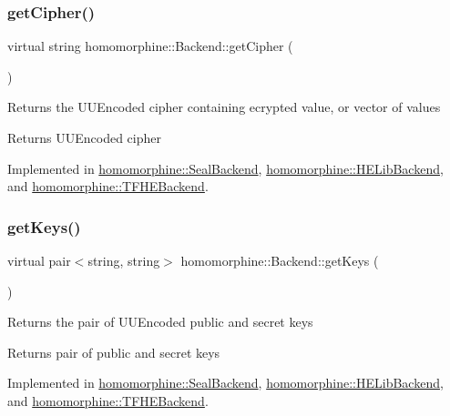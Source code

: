 \subsubsection{\texorpdfstring{getCipher()}{getCipher()}}
{\footnotesize\ttfamily virtual string homomorphine\+::\+Backend\+::get\+Cipher (\begin{DoxyParamCaption}{ }\end{DoxyParamCaption})\hspace{0.3cm}{\ttfamily [pure virtual]}}

Returns the U\+U\+Encoded cipher containing ecrypted value, or vector of values

\begin{DoxyReturn}{Returns}
U\+U\+Encoded cipher 
\end{DoxyReturn}


Implemented in \mbox{\hyperlink{classhomomorphine_1_1_seal_backend_a0917c586791e74b83f4ca0932e5e4d8e}{homomorphine\+::\+Seal\+Backend}}, \mbox{\hyperlink{classhomomorphine_1_1_h_e_lib_backend_a9ba4311289e3b8c47f389f4f44de7d5d}{homomorphine\+::\+H\+E\+Lib\+Backend}}, and \mbox{\hyperlink{classhomomorphine_1_1_t_f_h_e_backend_a91365d9637786bf06bfa16390b05e7a5}{homomorphine\+::\+T\+F\+H\+E\+Backend}}.

\mbox{\label{classhomomorphine_1_1_backend_a4c1062db09f76c74640f70b451d70729}} 
\subsubsection{\texorpdfstring{getKeys()}{getKeys()}}
{\footnotesize\ttfamily virtual pair$<$string, string$>$ homomorphine\+::\+Backend\+::get\+Keys (\begin{DoxyParamCaption}{ }\end{DoxyParamCaption})\hspace{0.3cm}{\ttfamily [pure virtual]}}

Returns the pair of U\+U\+Encoded public and secret keys

\begin{DoxyReturn}{Returns}
pair of public and secret keys 
\end{DoxyReturn}


Implemented in \mbox{\hyperlink{classhomomorphine_1_1_seal_backend_a30358e6405e2d1470468cf55aefb3f4d}{homomorphine\+::\+Seal\+Backend}}, \mbox{\hyperlink{classhomomorphine_1_1_h_e_lib_backend_ab45838cc01a4e71425e2aa0279e12c0e}{homomorphine\+::\+H\+E\+Lib\+Backend}}, and \mbox{\hyperlink{classhomomorphine_1_1_t_f_h_e_backend_a086a0c2c06b9703fbd54520933e7bd24}{homomorphine\+::\+T\+F\+H\+E\+Backend}}.

